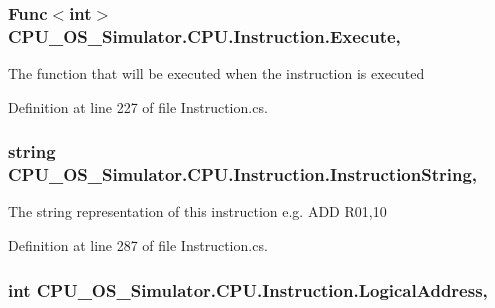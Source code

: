 \subsubsection[{Execute}]{\setlength{\rightskip}{0pt plus 5cm}Func$<$int$>$ C\+P\+U\+\_\+\+O\+S\+\_\+\+Simulator.\+C\+P\+U.\+Instruction.\+Execute\hspace{0.3cm}{\ttfamily [get]}, {\ttfamily [set]}}\label{class_c_p_u___o_s___simulator_1_1_c_p_u_1_1_instruction_afc4c52737c07181195a29413cf09d2a5}


The function that will be executed when the instruction is executed 



Definition at line 227 of file Instruction.\+cs.

\hypertarget{class_c_p_u___o_s___simulator_1_1_c_p_u_1_1_instruction_a2750b111d827f6e6a8fccd0e8520de89}{}
\subsubsection[{Instruction\+String}]{\setlength{\rightskip}{0pt plus 5cm}string C\+P\+U\+\_\+\+O\+S\+\_\+\+Simulator.\+C\+P\+U.\+Instruction.\+Instruction\+String\hspace{0.3cm}{\ttfamily [get]}, {\ttfamily [set]}}\label{class_c_p_u___o_s___simulator_1_1_c_p_u_1_1_instruction_a2750b111d827f6e6a8fccd0e8520de89}


The string representation of this instruction e.\+g. A\+D\+D R01,10 



Definition at line 287 of file Instruction.\+cs.

\hypertarget{class_c_p_u___o_s___simulator_1_1_c_p_u_1_1_instruction_abfc23dbc9a978d2a1468b819f87a7614}{}
\subsubsection[{Logical\+Address}]{\setlength{\rightskip}{0pt plus 5cm}int C\+P\+U\+\_\+\+O\+S\+\_\+\+Simulator.\+C\+P\+U.\+Instruction.\+Logical\+Address\hspace{0.3cm}{\ttfamily [get]}, {\ttfamily [set]}}\label{class_c_p_u___o_s___simulator_1_1_c_p_u_1_1_instruction_abfc23dbc9a978d2a1468b819f87a7614}


